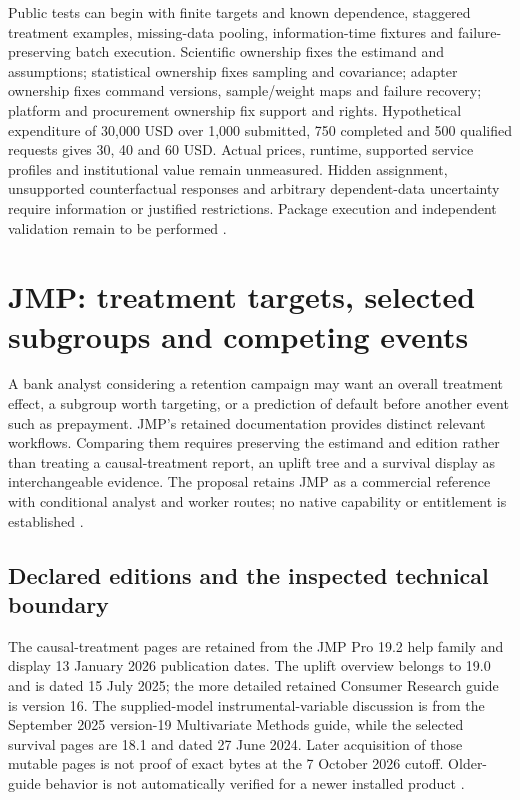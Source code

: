 Public tests can begin with finite targets and known dependence, staggered
treatment examples, missing-data pooling, information-time fixtures and
failure-preserving batch execution. Scientific ownership fixes the estimand
and assumptions; statistical ownership fixes sampling and covariance;
adapter ownership fixes command versions, sample/weight maps and failure
recovery; platform and procurement ownership fix support and rights.
Hypothetical expenditure of 30,000 USD over 1,000 submitted, 750 completed
and 500 qualified requests gives 30, 40 and 60 USD. Actual prices, runtime,
supported service profiles and institutional value remain unmeasured.
Hidden assignment, unsupported counterfactual responses and arbitrary
dependent-data uncertainty require information or justified restrictions.
Package execution and independent validation remain to be performed \cite{exec24_stata_choice}.


\section{JMP: treatment targets, selected subgroups and competing events}
\label{sec:exec24-jmp-reuse}

A bank analyst considering a retention campaign may want an overall
treatment effect, a subgroup worth targeting, or a prediction of default
before another event such as prepayment. JMP's retained documentation
provides distinct relevant workflows. Comparing them requires preserving
the estimand and edition rather than treating a causal-treatment report,
an uplift tree and a survival display as interchangeable evidence. The
proposal retains JMP as a commercial reference with conditional analyst
and worker routes; no native capability or entitlement is established
\cite{exec13_ch_jmp_causal,exec13_ch_jmp_uplift,exec14_survival_jmp,
exec24_jmp_choice}.

\subsection{Declared editions and the inspected technical boundary}
The causal-treatment pages are retained from the JMP Pro 19.2 help family
and display 13 January 2026 publication dates. The uplift overview belongs
to 19.0 and is dated 15 July 2025; the more detailed retained Consumer
Research guide is version 16. The supplied-model instrumental-variable
discussion is from the September 2025 version-19 Multivariate Methods
guide, while the selected survival pages are 18.1 and dated 27 June 2024.
Later acquisition of those mutable pages is not proof of exact bytes at
the 7 October 2026 cutoff. Older-guide behavior is not automatically
verified for a newer installed product
\cite{exec13_ch_jmp_causal,exec13_ch_jmp_uplift,exec13_ivrd_jmp,
exec14_survival_jmp}.

